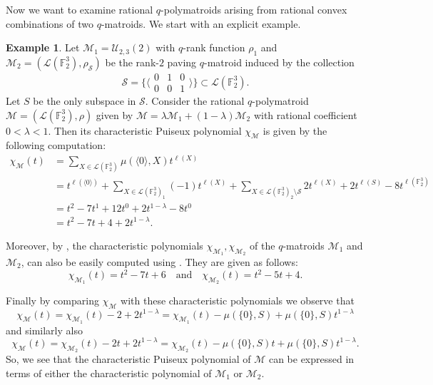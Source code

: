 \documentclass[a4paper,11pt,reqno]{amsart}
\theoremstyle{definition}
\newtheorem{example}[theorem]{{{Example}}}
\newcommand{\mM}{\mathcal{M}}
\newcommand{\mL}{\mathcal{L}}
\newcommand{\mU}{\mathcal{U}}
\newcommand{\mS}{\mathcal{S}}
\newcommand{\F}{\mathbb F}
\begin{document}
{Now we want to examine rational $q$-polymatroids arising from rational convex combinations of two $q$-matroids.
We start with an explicit example.

\begin{example}\label{ex: char_Puiseux_series}
    Let $\mM_1=\mU_{2,3}(2)$ with $q$-rank function $\rho_1$ and $\mM_2=(\mL(\F_2^3),\rho_\mS)$ be the rank-$2$ paving $q$-matroid induced by the collection 
    \[
        \mS=\bigg\{\bigg\langle
        \begin{matrix}
            0&1&0\\
            0&0&1
        \end{matrix}\bigg\rangle\bigg\}\subset\mL(\F_2^3).
    \]
    Let $S$ be the only subspace in $\mS$.
    Consider the rational $q$-polymatroid $\mM=(\mL(\F_2^3),\rho)$ given by $\mM=\lambda\mM_1+(1-\lambda)\mM_2$ with rational coefficient $0<\lambda<1$. Then its characteristic Puiseux polynomial $\chi_\mM$ is given by the following computation:
    \begin{align*}
        \chi_\mM(t)&=\sum_{X\in\mL(\F_2^3)}\mu(\langle 0\rangle,X)t^{\ell(X)}\\
                   &= t^{\ell(\langle 0\rangle)} + \sum_{X\in\mL(\F_2^3)_1}(-1)t^{\ell(X)}+ \sum_{X\in\mL(\F_2^3)_2\setminus\mS}2t^{\ell(X)}+2t^{\ell(S)}-8t^{\ell(\F_2^3)}\\
                   &=t^2-7t^{1}+12t^{0}+2t^{1-\lambda}-8t^{0}\\
                   &=t^2-7t+4+2t^{1-\lambda}.
    \end{align*}
    
    Moreover, by , the characteristic polynomials $\chi_{\mM_1},\chi_{\mM_2}$ of the $q$-matroids $\mM_1$ and $\mM_2$, can also be easily computed using . They are given as follows:
    \[
        \chi_{\mM_1}(t)=t^2-7t+6\quad\text{and}\quad\chi_{\mM_2}(t)=t^2-5t+4.
    \]

    Finally by comparing $\chi_\mM$ with these characteristic polynomials we observe that
     \[
        \chi_\mM(t)=\chi_{\mM_1}(t)-2+2t^{1-\lambda}=\chi_{\mM_1}(t)-\mu(\{0\},S)+\mu(\{0\},S)t^{1-\lambda}
    \]
    and similarly also
    \[
        \chi_\mM(t)=\chi_{\mM_2}(t)-2t+2t^{1-\lambda}=\chi_{\mM_2}(t)-\mu(\{0\},S)t+\mu(\{0\},S)t^{1-\lambda}.
    \]
    So, we see that the characteristic Puiseux polynomial of $\mM$ can be expressed in terms of either the characteristic polynomial of $\mM_1$ or $\mM_2$. 
\end{example}

}
\end{document}
